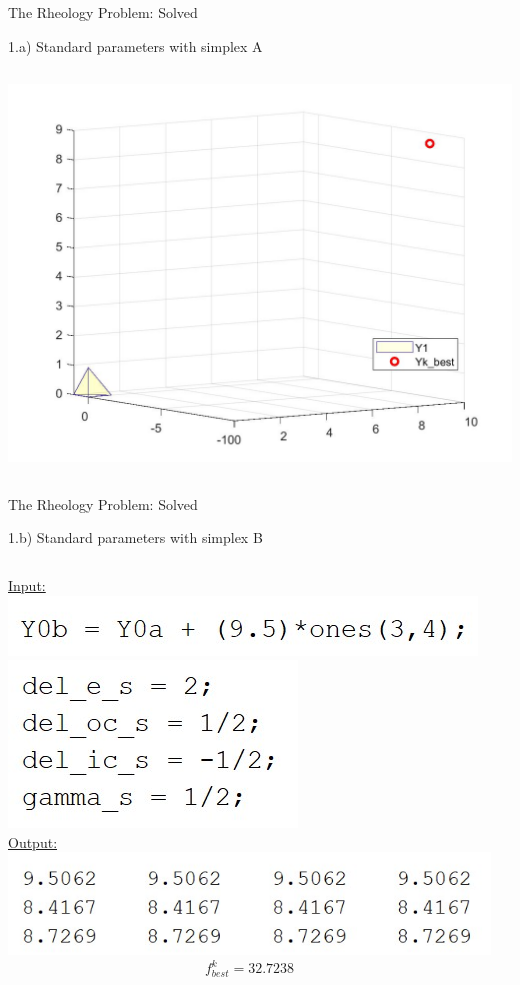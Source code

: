 \documentclass{beamer}
\begin{document}
\begin{frame}{The Rheology Problem: Solved}
\begin{block}{1.a) Standard parameters with simplex A}
\begin{columns}
\begin{column}{0.63\linewidth}
	\vspace{5mm}
	\includegraphics[width=0.45\linewidth]{1aSimplexPlot}
\end{column}
\end{columns}
\end{block}
\end{frame}

\begin{frame}{The Rheology Problem: Solved}
\begin{block}{1.b) Standard parameters with simplex B}
\begin{columns}
\begin{column}{0.35\linewidth}
	\underline{Input:}\\
	\includegraphics[width=0.75\linewidth]{Y0b}\\
	\includegraphics[width=0.45\linewidth]{StandardParams}\\
	\vspace{0.65cm}
	\underline{Output:}\\
	\includegraphics[width=0.95\linewidth]{1bSimplex}
	$$f^k_{best} = 32.7238$$
	\vspace{0.1cm}
\end{column}
\begin{column}{0.63\linewidth}

\end{column}
\end{columns}
\end{block}
\end{frame}
\end{document}
